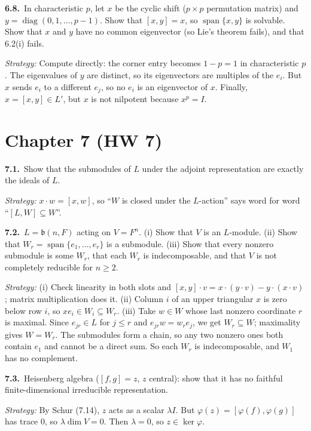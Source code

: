 \documentclass[11pt]{article}
\DeclareMathOperator{\Span}{span}
\newcommand{\prob}[3]{%
	\par\medskip\noindent\textbf{#1.}\ #2\par
	\noindent\hspace*{1.5em}\begin{minipage}[t]{\dimexpr\linewidth-1.5em}
		\textit{Strategy:} #3
	\end{minipage}\par}
\begin{document}
\prob{6.8}{In characteristic $p$, let $x$ be the cyclic shift ($p \times p$ permutation matrix) and $y = \operatorname{diag}(0,1,\dots,p-1)$.
	Show that $[x,y] = x$, so $\Span\{x,y\}$ is solvable.
	Show that $x$ and $y$ have no common eigenvector (so Lie's theorem fails), and that 6.2(i) fails.}
{Compute directly: the corner entry becomes $1 - p = 1$ in characteristic $p$.
	The eigenvalues of $y$ are distinct, so its eigenvectors are multiples of the $e_i$.
	But $x$ sends $e_i$ to a different $e_j$, so no $e_i$ is an eigenvector of $x$.
	Finally, $x = [x,y] \in L'$, but $x$ is not nilpotent because $x^p = I$.}

\section*{Chapter 7 (HW 7)}

\prob{7.1}{Show that the submodules of $L$ under the adjoint representation are exactly the ideals of $L$.}
{$x \cdot w = [x,w]$, so ``$W$ is closed under the $L$-action'' says word for word ``$[L,W] \subseteq W$''.}

\prob{7.2}{$L = \mathfrak{b}(n,F)$ acting on $V = F^n$.
	(i) Show that $V$ is an $L$-module.
	(ii) Show that $W_r = \Span\{e_1,\dots,e_r\}$ is a submodule.
	(iii) Show that every nonzero submodule is some $W_r$, that each $W_r$ is indecomposable, and that $V$ is not completely reducible for $n \ge 2$.}
{(i) Check linearity in both slots and $[x,y]\cdot v = x\cdot(y\cdot v) - y\cdot(x\cdot v)$; matrix multiplication does it.
	(ii) Column $i$ of an upper triangular $x$ is zero below row $i$, so $xe_i \in W_i \subseteq W_r$.
	(iii) Take $w \in W$ whose last nonzero coordinate $r$ is maximal.
	Since $e_{jr} \in L$ for $j \le r$ and $e_{jr}w = w_r e_j$, we get $W_r \subseteq W$; maximality gives $W = W_r$.
	The submodules form a chain, so any two nonzero ones both contain $e_1$ and cannot be a direct sum.
	So each $W_r$ is indecomposable, and $W_1$ has no complement.}

\prob{7.3}{Heisenberg algebra ($[f,g] = z$, $z$ central): show that it has no faithful finite-dimensional irreducible representation.}
{By Schur (7.14), $z$ acts as a scalar $\lambda I$.
	But $\varphi(z) = [\varphi(f),\varphi(g)]$ has trace $0$, so $\lambda \dim V = 0$.
	Then $\lambda = 0$, so $z \in \ker\varphi$.}
\end{document}
